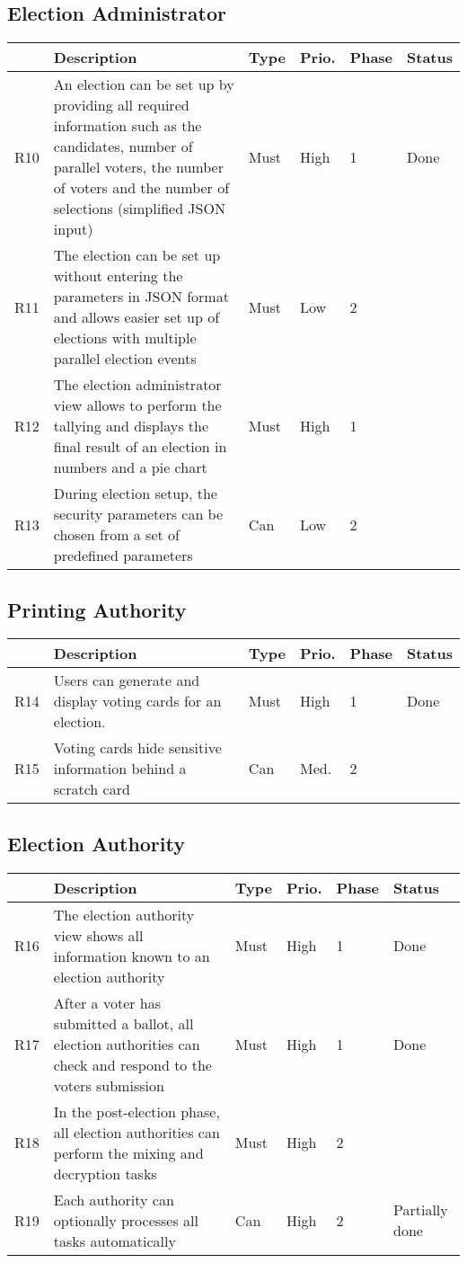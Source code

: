 \subsection{Election Administrator}
\begin{longtable}{p{0.5cm}p{9cm}p{1cm}p{1cm}p{1cm}p{1cm}}
\hline
 & Description & Type & Prio. & Phase & Status\\
\hline
R10 & An election can be set up by providing all required information such as the candidates, number of parallel voters, the number of voters and the number of selections (simplified JSON input) & Must & High & 1 & Done\\
R11 & The election can be set up without entering the parameters in JSON format and allows easier set up of elections with multiple parallel election events & Must & Low & 2 & \\
R12 & The election administrator view allows to perform the tallying and displays the final result of an election in numbers and a pie chart & Must & High & 1 & \\
R13 &  During election setup, the security parameters can be chosen from a set of predefined parameters & Can & Low & 2 & \\
\end{longtable}

\subsection{Printing Authority}
\begin{longtable}{p{0.5cm}p{9cm}p{1cm}p{1cm}p{1cm}p{1cm}}
\hline
 & Description & Type & Prio. & Phase & Status\\
\hline
R14 & Users can generate and display voting cards for an election. & Must & High & 1 & Done\\
R15 & Voting cards hide sensitive information behind a scratch card & Can & Med. & 2 & \\
\end{longtable}

\subsection{Election Authority}
\begin{longtable}{p{0.5cm}p{9cm}p{1cm}p{1cm}p{1cm}p{1cm}}
\hline
 & Description & Type & Prio. & Phase & Status\\
\hline
R16 & The election authority view shows all information known to an election authority & Must & High & 1 & Done\\
R17 & After a voter has submitted a ballot, all election authorities can check and respond to the voters submission & Must & High & 1 & Done\\
R18 & In the post-election phase, all election authorities can perform the mixing and decryption tasks & Must & High & 2 & \\
R19 & Each authority can optionally processes all tasks automatically & Can & High & 2 & Partially done\\
\end{longtable}


